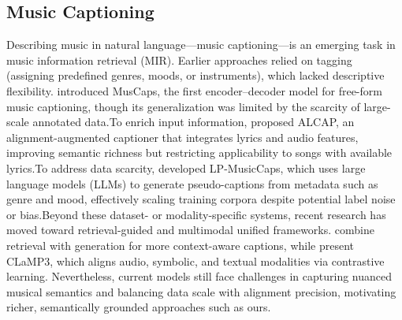 \documentclass[letterpaper]{article}
\begin{document}
\subsection{Music Captioning}
Describing music in natural language—music captioning—is an emerging task in music information retrieval (MIR). Earlier approaches relied on tagging (assigning predefined genres, moods, or instruments), which lacked descriptive flexibility. \cite{manco2021muscaps}introduced MusCaps, the first encoder–decoder model for free-form music captioning, though its generalization was limited by the scarcity of large-scale annotated data.To enrich input information, \cite{he2023alcap}proposed ALCAP, an alignment-augmented captioner that integrates lyrics and audio features, improving semantic richness but restricting applicability to songs with available lyrics.To address data scarcity, \cite{doh2023lp}developed LP-MusicCaps, which uses large language models (LLMs) to generate pseudo-captions from metadata such as genre and mood, effectively scaling training corpora despite potential label noise or bias.Beyond these dataset- or modality-specific systems, recent research has moved toward retrieval-guided and multimodal unified frameworks. \cite{srivatsan2024retrieval}combine retrieval with generation for more context-aware captions, while \cite{wu2025clamp3}present CLaMP3, which aligns audio, symbolic, and textual modalities via contrastive learning. Nevertheless, current models still face challenges in capturing nuanced musical semantics and balancing data scale with alignment precision, motivating richer, semantically grounded approaches such as ours.
\end{document}
